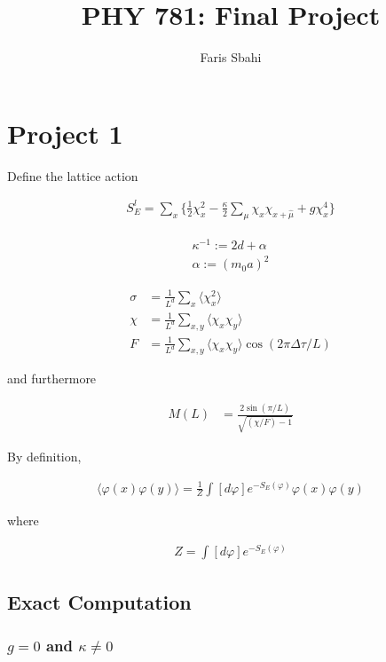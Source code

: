 \documentclass[12]{report}
\title{PHY 781: Final Project}
\author{Faris Sbahi}
\newcommand\0{\mathbf{0}}
\newcommand\<{\langle}
\renewcommand\>{\rangle}
\renewcommand\phi{\varphi}
\begin{document}
\maketitle

\chapter{Project 1}

Define the lattice action

\begin{align*}
S^l_E = \sum_x \{ \frac{1}{2} \chi_x^2 - \frac{\kappa}{2} \sum_{\mu} \chi_x \chi_{x + \hat{\mu}} + g \chi_x^4 \}
\end{align*}

\begin{align*}
\kappa^{-1} := 2d + \alpha \\
\alpha := (m_0a)^2
\end{align*}

\begin{align*}
\sigma &= \frac{1}{L^d}\sum_x \langle \chi^2_x \rangle\\
\chi &= \frac{1}{L^d}\sum_{x,y} \langle \chi_x \chi_y \rangle\\
F &= \frac{1}{L^d}\sum_{x,y} \langle \chi_x \chi_y \rangle \cos (2 \pi \Delta \tau / L)
\end{align*}

and furthermore

\begin{align*}
M(L) &= 	\frac{2 \sin (\pi / L)}{\sqrt{(\chi / F) - 1}}
\end{align*}


By definition,

\begin{align*}
\langle \phi(x) \phi(y)\rangle = \frac{1}{Z} \int [d \phi] e^{-S_E(\phi)} \phi(x) \phi(y)
\end{align*}

where 


\begin{align*}
Z = \int [d\phi] e^{-S_E(\phi)}
\end{align*}

\section{Exact Computation}

\subsection{$g=0$ and $\kappa \neq 0$}
\end{document}
